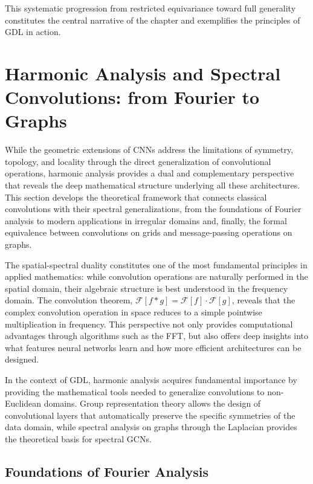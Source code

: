 This systematic progression from restricted equivariance toward full generality constitutes the central narrative of the chapter and exemplifies the principles of \gls{GDL} in action.

\section[Harmonic Analysis and Spectral Convolutions]{Harmonic Analysis and Spectral Convolutions: from Fourier to Graphs}\label{sec:analisis_armonico}

While the geometric extensions of \glspl{CNN} address the limitations of symmetry, topology, and locality through the direct generalization of convolutional operations, harmonic analysis provides a dual and complementary perspective that reveals the deep mathematical structure underlying all these architectures. This section develops the theoretical framework that connects classical convolutions with their spectral generalizations, from the foundations of Fourier analysis to modern applications in irregular domains and, finally, the formal equivalence between convolutions on grids and message-passing operations on graphs.

The spatial-spectral duality constitutes one of the most fundamental principles in applied mathematics: while convolution operations are naturally performed in the spatial domain, their algebraic structure is best understood in the frequency domain. The convolution theorem, $\mathcal{F}[f * g] = \mathcal{F}[f] \cdot \mathcal{F}[g]$, reveals that the complex convolution operation in space reduces to a simple pointwise multiplication in frequency. This perspective not only provides computational advantages through algorithms such as the \gls{FFT}, but also offers deep insights into what features neural networks learn and how more efficient architectures can be designed.

In the context of \gls{GDL}, harmonic analysis acquires fundamental importance by providing the mathematical tools needed to generalize convolutions to non-Euclidean domains. Group representation theory allows the design of convolutional layers that automatically preserve the specific symmetries of the data domain, while spectral analysis on graphs through the Laplacian provides the theoretical basis for spectral \glspl{GCN}.

\subsection{Foundations of Fourier Analysis}\label{subsec:fundamentos_fourier}


